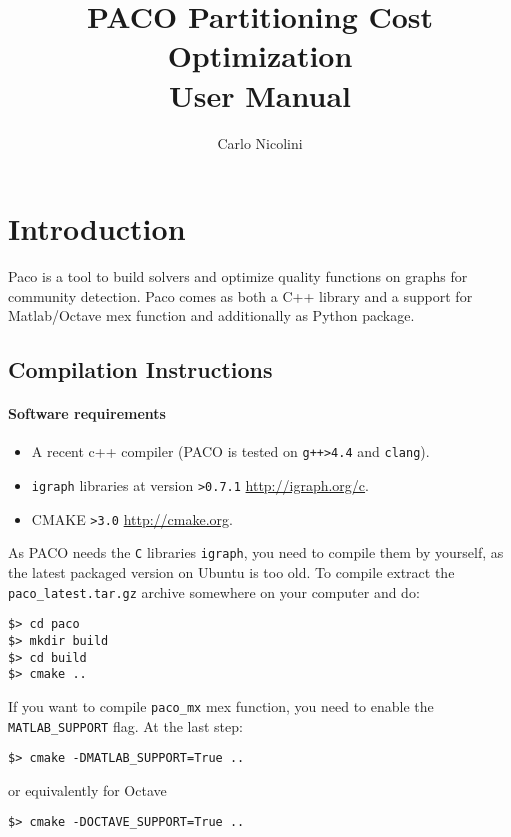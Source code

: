 \documentclass[11pt,%
              a4paper,%
]{article}
\title{PACO Partitioning Cost Optimization\\User Manual}
\author{Carlo Nicolini}
\begin{document}
\maketitle
\tableofcontents
\newpage

\section{Introduction}
Paco is a tool to build solvers and optimize quality functions on graphs
for community detection. Paco comes as both a C++ library and a support
for Matlab/Octave mex function and additionally as Python package.

\subsection{Compilation Instructions}
\paragraph{Software requirements}
\begin{itemize}
\item A recent c++ compiler (PACO is tested on \texttt{g++>4.4} and \texttt{clang}).
 \item \texttt{igraph} libraries at version \texttt{>0.7.1} \url{http://igraph.org/c}.
\item CMAKE \texttt{>3.0} \url{http://cmake.org}.
\end{itemize}

As PACO needs the \texttt{C} libraries \texttt{igraph}, you need to compile them by yourself, as the latest packaged version on Ubuntu is too old.
To compile extract the \texttt{paco\_latest.tar.gz} archive somewhere on your computer and do:
\bigbreak
\begin{verbatim}
$> cd paco
$> mkdir build
$> cd build
$> cmake ..
\end{verbatim}

If you want to compile \texttt{paco\_mx} mex function, you need to
enable the \texttt{MATLAB\_SUPPORT} flag. At the last step:

\begin{verbatim}
$> cmake -DMATLAB_SUPPORT=True ..
\end{verbatim}

or equivalently for Octave

\begin{verbatim}
$> cmake -DOCTAVE_SUPPORT=True ..
\end{verbatim}
\end{document}
